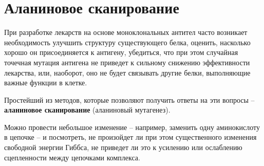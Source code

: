 




\newpage
\section{Аланиновое сканирование}
При разработке лекарств на основе моноклональных антител часто возникает необходимость улучшить структуру существующего белка, оценить, насколько хорошо он присоединяется к антигену, убедиться, что при этом случайная точечная мутация антигена не приведет к сильному снижению эффективности лекарства, или, наоборот, оно не будет связывать другие белки, выполняющие важные функции в клетке.

Простейший из методов, которые позволяют получить ответы на эти вопросы -- \textbf{аланиновое сканирование} (аланиновый мутагенез). 

Можно провести небольшое изменение -- например, заменить одну аминокислоту в цепочке -- и посмотреть, не произойдет ли при этом существенного изменения свободной энергии Гиббса, не приведет ли это к усилению или ослаблению сцепленности между цепочками комплекса.

